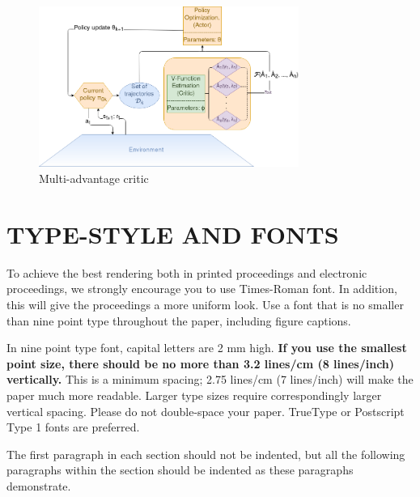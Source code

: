 \documentclass{article}
\begin{document}



\begin{figure}[htb]
\includegraphics[width=8.5cm]{model}
\caption{Multi-advantage critic}
\label{fig:model}
\end{figure}

\section{TYPE-STYLE AND FONTS}
\label{sec:typestyle}

To achieve the best rendering both in printed proceedings and electronic proceedings, we
strongly encourage you to use Times-Roman font.  In addition, this will give
the proceedings a more uniform look.  Use a font that is no smaller than nine
point type throughout the paper, including figure captions.

In nine point type font, capital letters are 2 mm high.  {\bf If you use the
smallest point size, there should be no more than 3.2 lines/cm (8 lines/inch)
vertically.}  This is a minimum spacing; 2.75 lines/cm (7 lines/inch) will make
the paper much more readable.  Larger type sizes require correspondingly larger
vertical spacing.  Please do not double-space your paper.  TrueType or
Postscript Type 1 fonts are preferred.

The first paragraph in each section should not be indented, but all the
following paragraphs within the section should be indented as these paragraphs
demonstrate.
\end{document}
